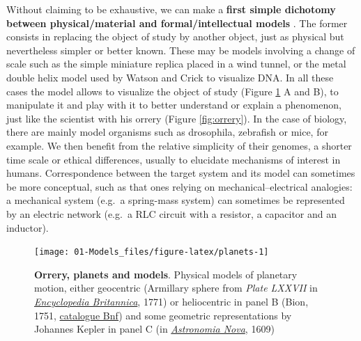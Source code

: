 \documentclass[a4paper,12pt,twoside,onecolumn,openright,final,oldfontcommands]{memoir}
\begin{document}
Without claiming to be exhaustive, we can make a \textbf{first simple
dichotomy between physical/material and formal/intellectual models}
\citep{rosenblueth1945role}. The former consists in replacing the object
of study by another object, just as physical but nevertheless simpler or
better known. These may be models involving a change of scale such as
the simple miniature replica placed in a wind tunnel, or the metal
double helix model used by Watson and Crick to visualize DNA. In all
these cases the model allows to visualize the object of study (Figure
\ref{fig:planets} A and B), to manipulate it and play with it to better
understand or explain a phenomenon, just like the scientist with his
orrery (Figure \ref{fig:orrery}). In the case of biology, there are
mainly model organisms such as drosophila, zebrafish or mice, for
example. We then benefit from the relative simplicity of their genomes,
a shorter time scale or ethical differences, usually to elucidate
mechanisms of interest in humans. Correspondence between the target
system and its model can sometimes be more conceptual, such as that ones
relying on mechanical--electrical analogies: a mechanical system (e.g.~a
spring-mass system) can sometimes be represented by an electric network
(e.g.~a RLC circuit with a resistor, a capacitor and an inductor).

\begin{figure}

{\centering \texttt{[image: 01-Models\_files/figure-latex/planets-1]} 

}

\caption[Orrery, planets and models]{\textbf{Orrery, planets and models}. Physical
models of planetary motion, either geocentric (Armillary sphere from
\emph{Plate LXXVII} in
\href{https://commons.wikimedia.org/wiki/File:EB1711_Armillary_Sphere.png}{\emph{Encyclopedia
Britannica}}, 1771) or heliocentric in panel B (Bion, 1751,
\href{https://gallica.bnf.fr/ark:/12148/btv1b2600252q/f8.item.r=Bion}{catalogue
Bnf}) and some geometric representations by Johannes Kepler in panel C
(in
\href{https://commons.wikimedia.org/wiki/File:Kepler_astronomia_nova.jpg}{\emph{Astronomia
Nova}}, 1609)}\label{fig:planets}
\end{figure}
\end{document}

